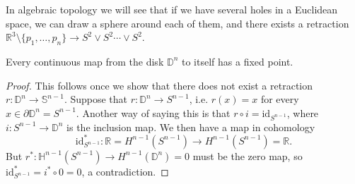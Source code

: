 In algebraic topology we will see that if we have several holes in a
Euclidean space, we can draw a sphere around each of them, and there exists a
retraction
$\mathbb{R}^3 \setminus \{p_1, \dots, p_n\} \to S^2 \vee S^2 \cdots
\vee S^2$.

\begin{theorem}
Every continuous map from the disk $\mathbb{D}^n$ to itself has a fixed
point.
\end{theorem}

\begin{proof}
This follows once we show that there does not exist a retraction
$r: \mathbb{D}^n \to \mathbb{S}^{n-1}$. Suppose that
$r : \mathbb{D}^{n} \to S^{n-1}$, i.e. $r(x) = x$ for every
$x \in \partial \mathbb{D}^{n} = S^{n-1}$. Another way of saying
this is that $r \circ i = \mathrm{id}_{S^{n-1}}$, where
$i: S^{n-1} \to \mathbb{D}^{n}$ is the inclusion map. We then have a
map in cohomology
$$
    \mathrm{id}_{S^{n-1}}^\ast
:   \mathbb{R} = H^{n-1}(S^{n-1})
\to H^{n-1}(S^{n-1}) = \mathbb{R}.
$$
But
$r^\ast : \mathbb{H}^{n-1}(S^{n-1}) \to H^{n-1}(\mathbb{D}^n) = 0$
must be the zero map, so
$\mathrm{id}_{S^{n-1}}^\ast = i^\ast \circ 0 = 0$, a contradiction.
\end{proof}

